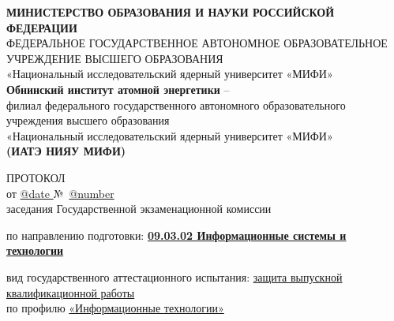 \documentclass[a4paper,12pt]{article} %
\begin{document}
	
\thispagestyle{empty}
	\begin{center} \small
		\textbf
		{МИНИСТЕРСТВО ОБРАЗОВАНИЯ И НАУКИ РОССИЙСКОЙ ФЕДЕРАЦИИ}\\
		\vspace{0.1cm}
		\tiny 
		ФЕДЕРАЛЬНОЕ ГОСУДАРСТВЕННОЕ АВТОНОМНОЕ ОБРАЗОВАТЕЛЬНОЕ УЧРЕЖДЕНИЕ
	    ВЫСШЕГО  ОБРАЗОВАНИЯ\\
		\small 
		«Национальный исследовательский ядерный университет «МИФИ»\\
		\textbf
		{Обнинский институт атомной энергетики} – \\
	    \footnotesize	
		филиал федерального государственного автономного образовательного учреждения высшего образования \\«Национальный исследовательский ядерный университет «МИФИ»\\
		\textbf{(ИАТЭ НИЯУ МИФИ)}
	\end{center}
	
\begin{center}
		ПРОТОКОЛ\\
		от \underline{@date } №\ \underline{@number }\\
		заседания Государственной экзаменационной комиссии \\		
\end{center}

\begin{center} 
	по направлению подготовки:
	\textbf
	{ \underline{09.03.02 Информационные системы и технологии} }
\end{center}

\begin{flushleft} \justifying
	вид государственного аттестационного испытания:
	\underline{защита выпускной квалификационной работы}\\
	по профилю 
	\underline{«Информационные технологии»}
\end{flushleft}
\end{document}

